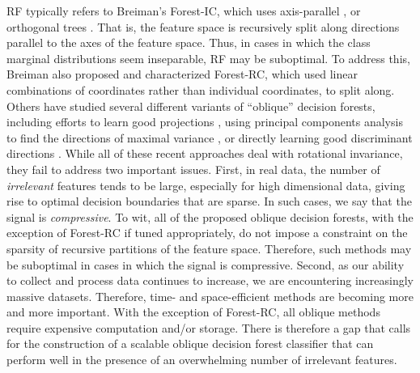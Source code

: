 \documentclass{article}
\begin{document}
RF typically refers to Breiman's Forest-IC, which uses axis-parallel \cite{Heath1993}, or orthogonal trees \cite{Menze2011}. That is, the feature space is recursively split along directions parallel to the axes of the feature space. Thus, in cases in which the class marginal distributions seem inseparable, RF may be suboptimal. To address this, Breiman also proposed and characterized Forest-RC, which used linear combinations of coordinates rather than individual coordinates, to split along. Others have studied several different variants of ``oblique'' decision forests, including efforts to learn good projections \cite{Heath1993,Tan2005}, using principal components analysis to find the directions of maximal variance \cite{Ho1998,Rodriguez2006}, or directly learning good discriminant directions \cite{Menze2011}. While all of these recent approaches deal with rotational invariance, they fail to address two important issues. First, in real data, the number of \textit{irrelevant} features tends to be large, especially for high dimensional data, giving rise to optimal decision boundaries that are sparse. In such cases, we say that the signal is \textit{compressive}. To wit, all of the proposed oblique decision forests, with the exception of Forest-RC if tuned appropriately, do not impose a constraint on the sparsity of recursive partitions of the feature space. Therefore, such methods may be suboptimal in cases in which the signal is compressive. Second, as our ability to collect and process data continues to increase, we are encountering increasingly massive datasets. Therefore, time- and space-efficient methods are becoming more and more important. With the exception of Forest-RC, all oblique methods require expensive computation and/or storage. There is therefore a gap that calls for the construction of a scalable oblique decision forest classifier that can perform well in the presence of an overwhelming number of irrelevant features. 
\end{document}
